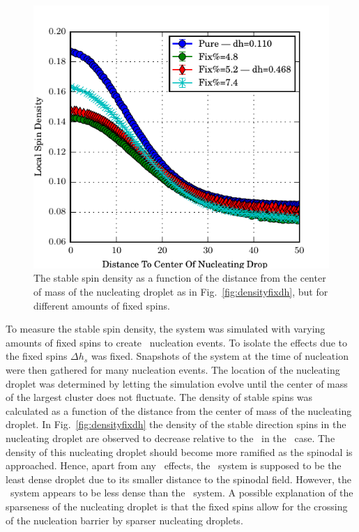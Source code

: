 \begin{figure}[!h]
 \centering
 \includegraphics[scale=1.05]{Figures/density/density_fix_var.pdf}
 \caption{ The stable spin density as a function of the distance from the center of mass of the nucleating droplet as in Fig.~\ref{fig:densityfixdh}, but for different amounts of fixed spins. }
 \label{fig:densityfixds}
\end{figure} %

To measure the stable spin density, the system was simulated with varying amounts of fixed spins to create \het\ nucleation events. To isolate the effects due to the fixed spins $\Delta h_s$ was fixed. Snapshots of the system at the time of nucleation were then gathered for many nucleation events. The location of the nucleating droplet was determined by letting the simulation evolve until the  center of mass of the largest cluster  does not fluctuate. The density of stable spins was calculated as a function of the distance from the center of mass of the nucleating droplet. In Fig.~\ref{fig:densityfixdh} the density of    the stable direction spins in the nucleating droplet are observed to decrease relative to the \nd\ in the \homo\ case. The density of this nucleating droplet should become more ramified as the spinodal is approached. Hence, apart from  any \het\ effects, the \homo\ system is supposed to be the least dense droplet due to its smaller distance to the spinodal field. However, the \het\ system appears to be less dense than the \homo\ system. A possible explanation of the sparseness of the nucleating droplet is  that the fixed spins allow for the crossing of the nucleation barrier by sparser nucleating droplets. %

